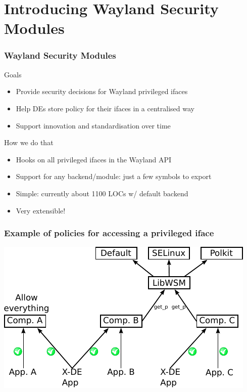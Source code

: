 \section{Introducing Wayland Security Modules}
\begin{frame}
\frametitle{Wayland Security Modules}
	
	\begin{block}{Goals}
	\begin{itemize}
	\item Provide security decisions for Wayland privileged ifaces
	\item Help DEs store policy for their ifaces in a centralised way
	\item Support innovation and standardisation over time
	\end{itemize}
	\end{block}

	\begin{block}{How we do that}
	\begin{itemize}
	\item Hooks on all privileged ifaces in the Wayland API
	\item Support for any backend/module: just a few symbols to export
	\item Simple: currently about 1100 LOCs w/ default backend
	\item Very extensible!
	\end{itemize}
	\end{block}

\end{frame}

\begin{frame}
\frametitle{Example of policies for accessing a privileged iface}
	\begin{center}
		\includegraphics[width=\linewidth]{figures/libwsm_with.pdf}
	\end{center}
\end{frame}

